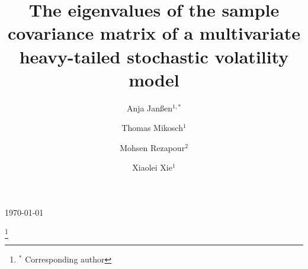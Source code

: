 \documentclass[leqno,10pt]{amsart}
\newcommand{\1}{{\bf 1}}
\newcommand{\8}{\infty}
\begin{document}
\today
\title[Eigenvalues of the sample covariance matrix of a   
stochastic volatility model]{The eigenvalues of the sample covariance matrix of a multivariate heavy-tailed 
stochastic volatility model}
\author{Anja Jan\ss en$^{1,\ast}$}
\author{Thomas Mikosch$^1$} 
\author{Mohsen Rezapour$^2$} 
\author{Xiaolei Xie$^1$}
\address{$^{1}$ Department  of Mathematical Sciences,
University of Copenhagen,
Universitetsparken 5,
DK-2100 Copenhagen,
Denmark}
\address{$^2$
Department of Statistics, Faculty of Mathematics and Computer, Shahid
Bahonar University of Kerman, Kerman, Iran}
\thanks{$^\ast$ Corresponding author}



\end{document}
